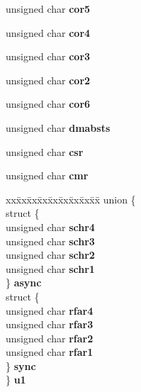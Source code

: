 \begin{DoxyCompactItemize}
\mbox{\label{structcd2401__regs___ac8c8fcc5be0545fb7e816ed45da35e54}} 
unsigned char {\bfseries cor5}
\item 
\mbox{\label{structcd2401__regs___abd51fd413b9402d5bee71ee67c23e18e}} 
unsigned char {\bfseries cor4}
\item 
\mbox{\label{structcd2401__regs___a0e7b6900dcbf59604a435f231ddc9737}} 
unsigned char {\bfseries cor3}
\item 
\mbox{\label{structcd2401__regs___aed51d8a386f490a3c5042deea2209bff}} 
unsigned char {\bfseries cor2}
\item 
\mbox{\label{structcd2401__regs___a991a0af9b37fe3d5e678e4fa9687bfa4}} 
unsigned char {\bfseries cor6}
\item 
\mbox{\label{structcd2401__regs___af1325262dcb536357b963c69ed75f315}} 
unsigned char {\bfseries dmabsts}
\item 
\mbox{\label{structcd2401__regs___a2be761cad960d17454d489a1eae620e6}} 
unsigned char {\bfseries csr}
\item 
\mbox{\label{structcd2401__regs___ac53c52498774375d5f454279a0448868}} 
unsigned char {\bfseries cmr}
\item 
\mbox{\label{structcd2401__regs___a4eb90635f847d5fcb479d746e7397dd9}} 
\begin{tabbing}
xx\=xx\=xx\=xx\=xx\=xx\=xx\=xx\=xx\=\kill
union \{\\
\>struct \{\\
\>\>unsigned char {\bfseries schr4}\\
\>\>unsigned char {\bfseries schr3}\\
\>\>unsigned char {\bfseries schr2}\\
\>\>unsigned char {\bfseries schr1}\\
\>\} {\bfseries async}\\
\>struct \{\\
\>\>unsigned char {\bfseries rfar4}\\
\>\>unsigned char {\bfseries rfar3}\\
\>\>unsigned char {\bfseries rfar2}\\
\>\>unsigned char {\bfseries rfar1}\\
\>\} {\bfseries sync}\\
\} {\bfseries u1}\\


\end{tabbing}
\end{DoxyCompactItemize}
